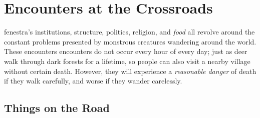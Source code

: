\chapter{Encounters at the Crossroads}
\label{encounters}

\Gls{fenestra}'s institutions, structure, politics, religion, and \emph{food} all revolve around the constant problems presented by monstrous creatures wandering around the world.
These encounters encounters do not occur every hour of every day; just as deer walk through dark forests for a lifetime, so people can also visit a nearby \gls{village} without certain death.
However, they will experience a \textit{reasonable danger} of death if they walk carefully, and worse if they wander carelessly.

\section{Things on the Road}

